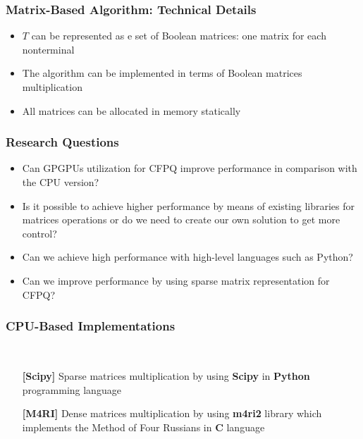 \documentclass[xcolor=table]{beamer}
\begin{document}
  \begin{frame}[fragile] \frametitle{Matrix-Based Algorithm: Technical Details}
    \begin{itemize}
      \item $T$ can be represented as e set of Boolean matrices: one matrix for each nonterminal
      \item The algorithm can be implemented in terms of Boolean matrices multiplication
      \item All matrices can be allocated in memory statically
    \end{itemize}
  \end{frame}


\begin{frame}[fragile] \frametitle{Research Questions}
  \begin{itemize}
    \item Can GPGPUs utilization for CFPQ improve performance in comparison with the CPU version?
    \pause
    \item Is it possible to achieve higher performance by means of existing libraries for matrices operations or do we need to create our own solution to get more control?
    \pause
    \item Can we achieve high performance with high-level languages such as Python?
    \pause
    \item Can we improve performance by using sparse matrix representation for CFPQ?
  \end{itemize}
\end{frame}


\begin{frame}[fragile] \frametitle{CPU-Based Implementations}
  \begin{minipage}[t]{1cm}
\hspace{1cm}
  \end{minipage}
  ~
\begin{minipage}[t]{0.85\textwidth}
\begin{itemize}
  \item[\textbf{[Scipy]}] Sparse matrices multiplication by using \textbf{Scipy} in \textbf{Python} programming language
\pause
  \item[\textbf{[M4RI]}] Dense matrices multiplication by using \textbf{m4ri2} library which implements the Method of Four Russians in \textbf{C} language
\end{itemize}
\end{minipage}
\end{frame}
\end{document}
